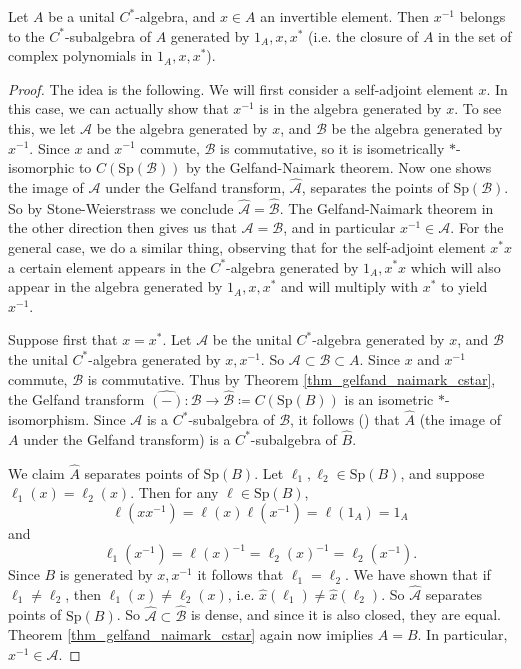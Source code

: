 \documentclass[12pt]{article}
\begin{document}
\begin{theorem}
\label{thm_inverse_in_generated_cstar_algebra}
	Let $A$ be a unital $C^\ast$-algebra, and $x\in A$ an invertible element. Then $x^{-1}$ belongs to the $C^\ast$-subalgebra of $A$ generated by $1_A, x, x^\ast$ (i.e. the closure of $A$ in the set of complex polynomials in $1_A, x, x^\ast$).
\end{theorem}
\begin{proof}
	The idea is the following. We will first consider a self-adjoint element $x$. In this case, we can actually show that $x^{-1}$ is in the algebra generated by $x$. To see this, we let $\mathcal{A}$ be the algebra generated by $x$, and $\mathcal{B}$ be the algebra generated by $x^{-1}$. Since $x$ and $x^{-1}$ commute, $\mathcal{B}$ is commutative, so it is isometrically $\ast$-isomorphic to $C(\text{Sp}(\mathcal{B}))$ by the Gelfand-Naimark theorem. Now one shows the image of $\mathcal{A}$ under the Gelfand transform, $\hat{\mathcal{A}}$, separates the points of $\text{Sp}(\mathcal{B})$. So by Stone-Weierstrass we conclude $\hat{\mathcal{A}}=\hat{\mathcal{B}}$. The Gelfand-Naimark theorem in the other direction then gives us that $\mathcal{A}=\mathcal{B}$, and in particular $x^{-1}\in\mathcal{A}$. For the general case, we do a similar thing, observing that for the self-adjoint element $x^\ast x$ a certain element appears in the $C^\ast$-algebra generated by $1_A, x^\ast x$ which will also appear in the algebra generated by $1_A,x,x^\ast$ and will multiply with $x^\ast$ to yield $x^{-1}$. 

	Suppose first that $x=x^\ast$. Let $\mathcal{A}$ be the unital $C^\ast$-algebra generated by $x$, and $\mathcal{B}$ the unital $C^\ast$-algebra generated by $x,x^{-1}$. So $\mathcal{A}\subset\mathcal{B}\subset A$. Since $x$ and $x^{-1}$ commute, $\mathcal{B}$ is commutative. Thus by Theorem \ref{thm_gelfand_naimark_cstar}, the Gelfand transform $\widehat{(-)}:\mathcal{B}\to\hat{\mathcal{B}}\coloneqq C(\text{Sp}(B))$ is an isometric $\ast$-isomorphism. Since $\mathcal{A}$ is a $C^\ast$-subalgebra of $\mathcal{B}$, it follows () that $\hat{A}$ (the image of $A$ under the Gelfand transform) is a $C^\ast$-subalgebra of $\hat{B}$. 

	We claim $\hat{A}$ separates points of $\text{Sp}(B)$. Let $\ell_1,\ell_2\in\text{Sp}(B)$, and suppose $\ell_1(x)=\ell_2(x)$. Then for any $\ell\in\text{Sp}(B)$,
	\begin{equation*}
		\ell(xx^{-1}) = \ell(x)\ell(x^{-1})=\ell(1_A)=1_A
	\end{equation*}
	and
	\begin{equation*}
		\ell_1(x^{-1}) = \ell(x)^{-1} = \ell_2(x)^{-1} = \ell_2(x^{-1}).
	\end{equation*}
	Since $B$ is generated by $x, x^{-1}$ it follows that $\ell_1=\ell_2$. We have shown that if $\ell_1\neq \ell_2$, then $\ell_1(x)\neq\ell_2(x)$, i.e. $\hat{x}(\ell_1) \neq \hat{x}(\ell_2)$. So $\hat{\mathcal{A}}$ separates points of $\text{Sp}(B)$. So $\hat{\mathcal{A}}\subset\hat{\mathcal{B}}$ is dense, and since it is also closed, they are equal. Theorem \ref{thm_gelfand_naimark_cstar} again now imiplies $A=B$. In particular, $x^{-1}\in\mathcal{A}$. 


\end{proof}
\end{document}
